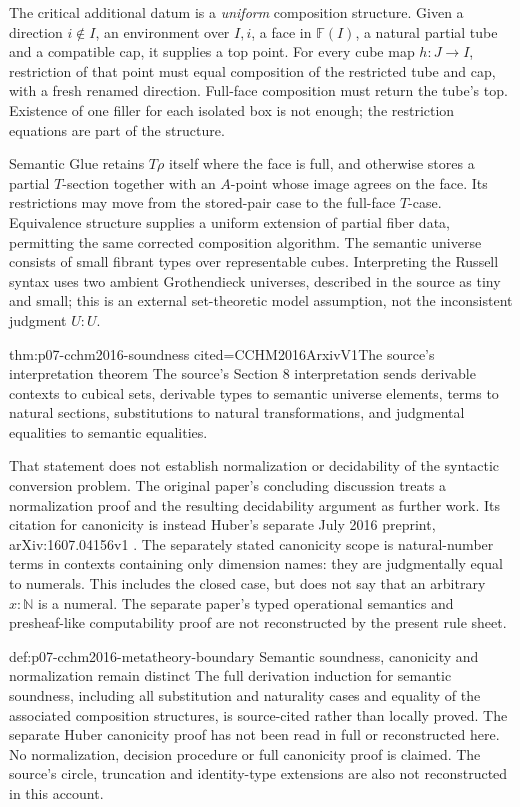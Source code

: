 The critical additional datum is a \emph{uniform} composition
structure.  Given a direction \(i\notin I\), an environment over
\(I,i\), a face in \(\mathbb F(I)\), a natural partial tube and a
compatible cap, it supplies a top point.  For every cube map
\(h:J\to I\), restriction of that point must equal composition of
the restricted tube and cap, with a fresh renamed direction.
Full-face composition must return the tube's top.  Existence of one
filler for each isolated box is not enough; the restriction equations
are part of the structure.

Semantic Glue retains \(T\rho\) itself where the face is full, and
otherwise stores a partial \(T\)-section together with an \(A\)-point
whose image agrees on the face.  Its restrictions may move from the
stored-pair case to the full-face \(T\)-case.  Equivalence structure
supplies a uniform extension of partial fiber data, permitting the
same corrected composition algorithm.  The semantic universe consists
of small fibrant types over representable cubes.  Interpreting the
Russell syntax uses two ambient Grothendieck universes, described in
the source as tiny and small; this is an external set-theoretic model
assumption, not the inconsistent judgment \(U:U\).

\begin{hbtheorem}{thm:p07-cchm2016-soundness}
 {cited=CCHM2016ArxivV1}{The source's interpretation theorem}
The source's Section 8 interpretation sends derivable contexts to
cubical sets, derivable types to semantic universe elements, terms
to natural sections, substitutions to natural transformations, and
judgmental equalities to semantic equalities.
\end{hbtheorem}

That statement does not establish normalization or decidability of
the syntactic conversion problem.  The original paper's concluding
discussion treats a normalization proof and the resulting decidability
argument as further work.  Its citation for canonicity is instead
Huber's separate July 2016 preprint, arXiv:1607.04156v1
\cite{Huber2016CanonicityV1}.  The separately stated canonicity scope is
natural-number terms in contexts containing only dimension names:
they are judgmentally equal to numerals.  This includes the closed
case, but does not say that an arbitrary \(x:\mathbb N\) is a numeral.
The separate paper's typed operational semantics and presheaf-like
computability proof are not reconstructed by the present rule sheet.

\begin{proofboundary}{def:p07-cchm2016-metatheory-boundary}
 {Semantic soundness, canonicity and normalization remain distinct}
The full derivation induction for semantic soundness, including all
substitution and naturality cases and equality of the associated
composition structures, is source-cited rather than locally proved.
The separate Huber canonicity proof has not been read in full or
reconstructed here.  No normalization, decision procedure or full
canonicity proof is claimed.  The source's circle, truncation and
identity-type extensions are also not reconstructed in this account.
\end{proofboundary}

